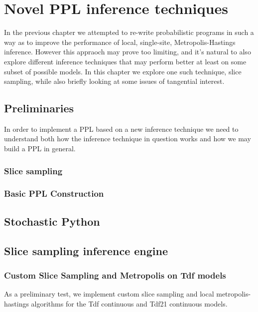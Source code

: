 \chapter{Novel PPL inference techniques}
\label{chap:infEngines}

In the previous chapter we attempted to re-write probabilistic programs in such a way as to improve the performance of local, single-site, Metropolis-Hastings inference. However this appraoch may prove too limiting, and it's natural to also explore different inference techniques that may perform better at least on some subset of possible models. In this chapter we explore one such technique, slice sampling, while also briefly looking at some issues of tangential interest.

\section{Preliminaries}
In order to implement a PPL based on a new inference technique we need to understand both how the inference technique in question works and how we may build a PPL in general.

\subsection{Slice sampling}

\subsection{Basic PPL Construction}

\section{Stochastic Python}

\section{Slice sampling inference engine}
\subsection{Custom Slice Sampling and Metropolis on Tdf models}

As a preliminary test, we implement custom slice sampling and local metropolis-hastings algorithms for the Tdf continuous and Tdf21 continuous models. 

